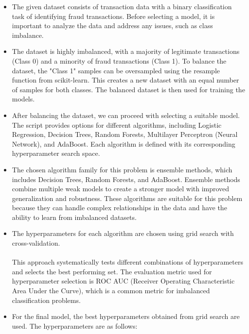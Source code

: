 \documentclass[a4, 10 pt, conference]{ieeeconf}  %
\begin{document}
{\color{black}

\begin{itemize} \textbfn
	\item The given dataset consists of transaction data with a binary classification task of identifying fraud transactions. Before selecting a model, it is important to analyze the data and address any issues, such as class imbalance.

	\item The dataset is highly imbalanced, with a majority of legitimate transactions (Class 0) and a minority of fraud transactions (Class 1). To balance the dataset, the "Class 1" samples can be oversampled using the resample function from scikit-learn. This creates a new dataset with an equal number of samples for both classes. The balanced dataset is then used for training the models.

	\item After balancing the dataset, we can proceed with selecting a suitable model. The script provides options for different algorithms, including Logistic Regression, Decision Trees, Random Forests, Multilayer Perceptron (Neural Network), and AdaBoost. Each algorithm is defined with its corresponding hyperparameter search space.

	\item The chosen algorithm family for this problem is ensemble methods, which includes Decision Trees, Random Forests, and AdaBoost. Ensemble methods combine multiple weak models to create a stronger model with improved generalization and robustness. These algorithms are suitable for this problem because they can handle complex relationships in the data and have the ability to learn from imbalanced datasets.

	\item The hyperparameters for each algorithm are chosen using grid search with cross-validation.\\ \\[1em] This approach 
	systematically tests different combinations of hyperparameters and selects the best performing set. The evaluation metric used for hyperparameter selection is ROC AUC (Receiver Operating Characteristic Area Under the Curve), which is a common metric for imbalanced classification problems.

	\item For the final model, the best hyperparameters obtained from grid search are used. The hyperparameters are as follows:


\end{itemize}}
\end{document}
